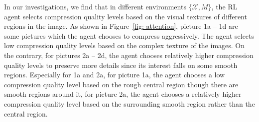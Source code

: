 In our investigations, we find that in different environments $ \{\mathcal{X}, M\} $, the RL agent selects compression quality levels based on the visual textures of different regions in the image. As shown in Figure~\ref{fig: attention}, picture 1a -- 1d are some pictures which the agent chooses to compress aggressively. The agent selects low compression quality levels based on the complex texture of the images. On the contrary, for pictures 2a -- 2d, the agent chooses relatively higher compression quality levels to preserve more details since its interest falls on some smooth regions. Especially for 1a and 2a, for picture 1a, the agent chooses a low compression quality level based on the rough central region though there are smooth regions around it, for picture 2a, the agent chooses a relatively higher compression quality level based on the surrounding smooth region rather than the central region. %
